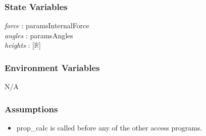 \documentclass[12pt, titlepage]{article}
\begin{document}
\subsubsection{State Variables}
\textit{force} : paramsInternalForce\\
\textit{angles} : paramsAngles\\
\textit{heights} : [$\mathbb{R}$]\\

\subsubsection{Environment Variables}
N/A

\subsubsection{Assumptions}
\begin{itemize}
	\item prop\_calc is called before any of the other access programs.
\end{itemize}
\end{document}
